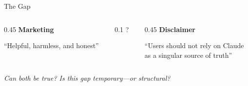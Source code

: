 \documentclass[aspectratio=169,11pt]{beamer}
\begin{document}
\begin{frame}{The Gap}
    \begin{columns}
        \begin{column}{0.45\textwidth}
            \centering
            \textbf{\large Marketing}

            \vspace{1em}
            \textcolor{truthgreen}{``Helpful, harmless, and honest''}
        \end{column}
        \begin{column}{0.1\textwidth}
            \centering
            \Huge ?
        \end{column}
        \begin{column}{0.45\textwidth}
            \centering
            \textbf{\large Disclaimer}

            \vspace{1em}
            \textcolor{warnred}{``Users should not rely on Claude\\as a singular source of truth''}
        \end{column}
    \end{columns}

    \vspace{2em}
    \pause
    \begin{center}
        \textit{Can both be true? Is this gap temporary---or structural?}
    \end{center}

\end{frame}
\end{document}
